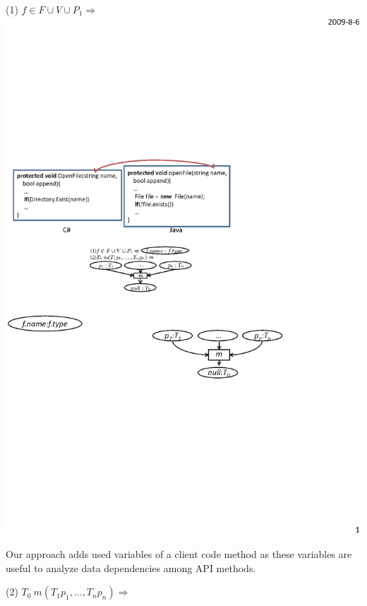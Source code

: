 (1) $f\in F\cup V \cup P_1 \Rightarrow $
\includegraphics[scale=0.7,clip]{figure/rule1.eps}%

Our approach adds used variables of a client code method as these
variables are useful to analyze data dependencies among API methods.

(2) $T_0\ m (T_1 p_1, \ldots, T_n p_n) \Rightarrow $

